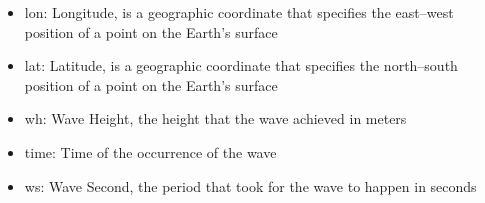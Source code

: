 \documentclass[12pt]{article}
\begin{document}
\begin{itemize}

\item lon: Longitude, is a geographic coordinate that specifies the east–west position of a point on the Earth's surface
\item lat: Latitude, is a geographic coordinate that specifies the north–south position of a point on the Earth's surface
\item wh: Wave Height, the height that the wave achieved in meters 
\item time: Time of the occurrence of the wave
\item ws: Wave Second, the period that took for the wave to happen in seconds

\end{itemize}
\end{document}
